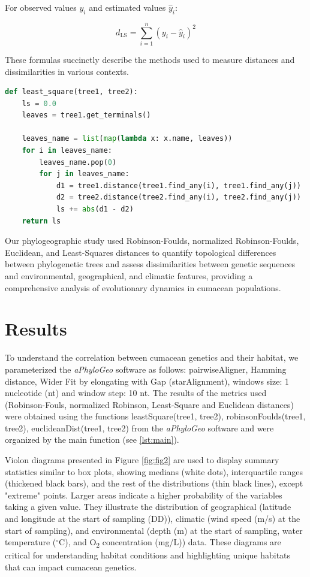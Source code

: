 For observed values $y_i$ and estimated values $\hat{y}_i$:

\begin{equation}\label{eq:ls}
    d_{\text{LS}} = \sum_{i=1}^{n} (y_i - \hat{y}_i)^2
\end{equation}

These formulas succinctly describe the methods used to measure distances and dissimilarities in various contexts.

\begin{lstlisting}[label=lst:LeastSquare, language=Python, caption=Python script for calculating the Least-Square distance using the ete3 package in the aPhyloGeo package]
def least_square(tree1, tree2):
    ls = 0.0
    leaves = tree1.get_terminals()

    leaves_name = list(map(lambda x: x.name, leaves))
    for i in leaves_name:
        leaves_name.pop(0)
        for j in leaves_name:
            d1 = tree1.distance(tree1.find_any(i), tree1.find_any(j))
            d2 = tree2.distance(tree2.find_any(i), tree2.find_any(j))
            ls += abs(d1 - d2)
    return ls
\end{lstlisting}

Our phylogeographic study used Robinson-Foulds, normalized Robinson-Foulds, Euclidean, and Least-Squares distances to quantify topological differences between phylogenetic trees and assess dissimilarities between genetic sequences and environmental, geographical, and climatic features, providing a comprehensive analysis of evolutionary dynamics in cumacean populations.

\section{Results}\label{results}

To understand the correlation between cumacean genetics and their habitat, we parameterized the \textit{aPhyloGeo} software as follows: pairwiseAligner, Hamming distance, Wider Fit by elongating with Gap (starAlignment), windows size: 1 nucleotide (nt) and window step: 10 nt. The results of the metrics used (Robinson-Fouls, normalized Robinson, Least-Square and Euclidean distances) were obtained using the functions leastSquare(tree1, tree2), robinsonFoulds(tree1, tree2), euclideanDist(tree1, tree2) from the \textit{aPhyloGeo} software and were organized by the main function (see \autoref{lst:main}). 

Violon diagrams presented in Figure \ref{fig:fig2} are used to display summary statistics similar to box plots, showing medians (white dots), interquartile ranges (thickened black bars), and the rest of the distributions (thin black lines), except "extreme" points. Larger areas indicate a higher probability of the variables taking a given value. They illustrate the distribution of geographical (latitude and longitude at the start of sampling (DD)), climatic (wind speed (m/s) at the start of sampling), and environmental (depth (m) at the start of sampling, water temperature ($^\circ$C), and O\textsubscript{2} concentration (mg/L)) data. These diagrams are critical for understanding habitat conditions and highlighting unique habitats that can impact cumacean genetics. 

